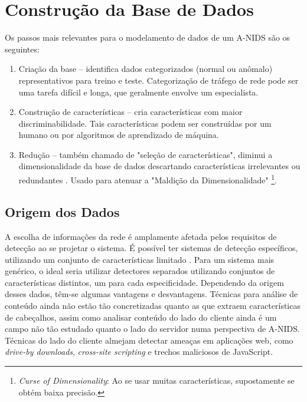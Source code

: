 \chapter{Construção da Base de Dados}
\label{ch:dados}
Os passos mais relevantes para o modelamento de dados de um A-NIDS são os seguintes:
\begin{enumerate}
    \item Criação da base -- identifica dados categorizados (normal ou anômalo) representativos para treino e teste.
    Categorização de tráfego de rede pode ser uma tarefa difícil e longa, que geralmente envolve um especialista.
    \item Construção de características -- cria características com maior discriminabilidade. Tais características
    podem ser construídas por um humano ou por algoritmos de aprendizado de máquina.
    \item Redução -- também chamado de "seleção de características", diminui a dimensionalidade da base de dados
    descartando características irrelevantes ou redundantes \cite{song13}. Usado para atenuar a "Maldição da
    Dimensionalidade" \footnote{\textit{Curse of Dimensionality}: Ao se usar muitas características,
    supostamente se obtém baixa precisão.}.
\end{enumerate}


\section{Origem dos Dados}
A escolha de informações da rede é amplamente afetada pelos requisitos de detecção ao se projetar o sistema.
É possível ter sistemas de detecção específicos, utilizando um conjunto de características limitado \cite{guanzhong09}.
Para um sistema mais genérico, o ideal seria utilizar detectores separados utilizando conjuntos de características
distintos, um para cada especificidade. Dependendo da origem desses dados, têm-se algumas vantagens e desvantagens.
Técnicas para análise de conteúdo ainda não estão tão concretizadas quanto as que extraem características de
cabeçalhos, assim como analisar conteúdo do lado do cliente ainda é um campo não tão estudado quanto o lado do servidor
numa perspectiva de A-NIDS. Técnicas do lado do cliente almejam detectar ameaças em aplicações web, como \textit{drive-by
downloads}, \textit{cross-site scripting} e trechos maliciosos de JavaScript.

